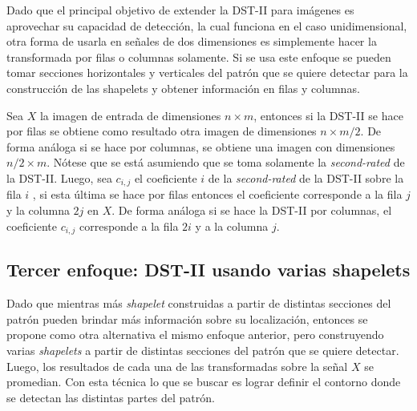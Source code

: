 Dado que el principal objetivo de extender la DST-II para imágenes es aprovechar su capacidad de detección, la cual funciona 
en el caso unidimensional, otra forma de usarla en señales de dos dimensiones es simplemente hacer la transformada
por filas o columnas solamente.
Si se usa este enfoque se pueden tomar secciones horizontales y verticales del patrón que se quiere detectar para 
la construcción de las shapelets y obtener información en filas y columnas.

Sea $X$ la imagen de entrada de dimensiones $n\times m$, entonces si la DST-II se hace por filas se obtiene
como resultado otra imagen de dimensiones $n \times m/2$. De forma análoga si se hace por columnas, se obtiene
una imagen con dimensiones $n/2 \times m$. Nótese que se está asumiendo que se toma solamente la 
\textit{second-rated} de la DST-II. Luego, sea $c_{i,j}$ el coeficiente $i$ de la \textit{second-rated} 
de la DST-II sobre la fila $i$ , si esta última se hace por filas
entonces el coeficiente corresponde a la fila $j$ y la columna $2j$ en $X$. De forma análoga si se hace
la DST-II por columnas, el coeficiente $c_{i,j}$ corresponde a la fila $2i$ y a la columna $j$.

\subsection{Tercer enfoque: DST-II usando varias shapelets}

Dado que mientras más \textit{shapelet} construidas a partir de distintas secciones del patrón pueden brindar más información
sobre su localización, entonces se propone como otra alternativa el mismo enfoque anterior, pero construyendo
varias \textit{shapelets} a partir de distintas secciones del patrón que se quiere detectar. Luego, los resultados
de cada una de las transformadas sobre la señal $X$ se promedian. Con esta técnica lo que se buscar es lograr definir
el contorno donde se detectan las distintas partes del patrón.
